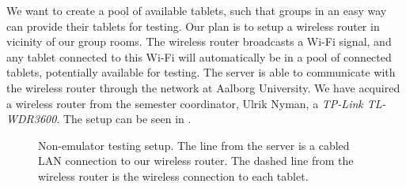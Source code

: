 We want to create a pool of available tablets, such that groups in an easy way can provide their tablets for testing. Our plan is to setup a wireless router in vicinity of our group rooms. The wireless router broadcasts a Wi-Fi signal, and any tablet connected to this Wi-Fi will automatically be in a pool of connected tablets, potentially available for testing. The server is able to communicate with the wireless router through the network at Aalborg University. We have acquired a wireless router from the semester coordinator, Ulrik Nyman, a \emph{TP-Link TL-WDR3600}. The setup can be seen in .

\begin{figure}%
  \centering
  \caption[Some short text]{Non-emulator testing setup. The line from the server is a cabled LAN connection to our wireless router. The dashed line from the wireless router is the wireless connection to each tablet.}%
  \label{fig:wireless_router}%
\end{figure}

